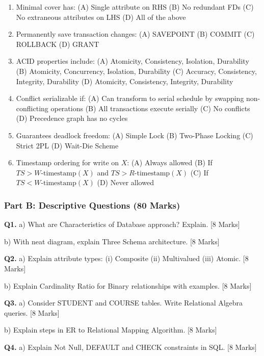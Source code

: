 \documentclass[11pt,a4paper]{article}
\begin{document}
\begin{enumerate}
\item Minimal cover has: (A) Single attribute on RHS (B) No redundant FDs (C) No extraneous attributes on LHS (D) All of the above

\item Permanently save transaction changes: (A) SAVEPOINT (B) COMMIT (C) ROLLBACK (D) GRANT

\item ACID properties include: (A) Atomicity, Consistency, Isolation, Durability (B) Atomicity, Concurrency, Isolation, Durability (C) Accuracy, Consistency, Integrity, Durability (D) Atomicity, Consistency, Integrity, Durability

\item Conflict serializable if: (A) Can transform to serial schedule by swapping non-conflicting operations (B) All transactions execute serially (C) No conflicts (D) Precedence graph has no cycles

\item Guarantees deadlock freedom: (A) Simple Lock (B) Two-Phase Locking (C) Strict 2PL (D) Wait-Die Scheme

\item Timestamp ordering for write on $X$: (A) Always allowed (B) If $TS > W\text{-timestamp}(X)$ and $TS > R\text{-timestamp}(X)$ (C) If $TS < W\text{-timestamp}(X)$ (D) Never allowed
\end{enumerate}

\subsubsection*{Part B: Descriptive Questions (80 Marks)}

\textbf{Q1.} a) What are Characteristics of Database approach? Explain. \hfill [8 Marks]

b) With neat diagram, explain Three Schema architecture. \hfill [8 Marks]

\textbf{Q2.} a) Explain attribute types: (i) Composite (ii) Multivalued (iii) Atomic. \hfill [8 Marks]

b) Explain Cardinality Ratio for Binary relationships with examples. \hfill [8 Marks]

\textbf{Q3.} a) Consider STUDENT and COURSE tables. Write Relational Algebra queries. \hfill [8 Marks]

b) Explain steps in ER to Relational Mapping Algorithm. \hfill [8 Marks]

\textbf{Q4.} a) Explain Not Null, DEFAULT and CHECK constraints in SQL. \hfill [8 Marks]
\end{document}
